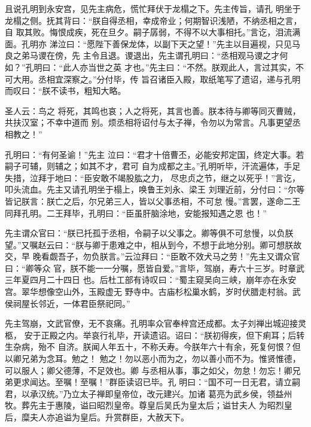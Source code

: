 \documentclass[UTF8,12pt,twoside,a4paper]{ctexart} %
\begin{document}
且说孔明到永安宫，见先主病危，慌忙拜伏于龙榻之下。先主传旨，请孔
明坐于龙榻之侧。抚其背曰：“朕自得丞相，幸成帝业；何期智识浅陋，不纳丞相之言，自
取其败。悔恨成疾，死在旦夕。嗣子孱弱，不得不以大事相托。”言讫，泪流满面。孔明亦
涕泣曰：“愿陛下善保龙体，以副下天之望！”先主以目遍视，只见马良之弟马谡在傍，先
主令且退。谡退出，先主谓孔明曰：“丞相观马谡之才何如？”孔明曰：“此人亦当世之英
才也。”先主曰：“不然。朕观此人，言过其实，不可大用。丞相宜深察之。”分付毕，传
旨召诸臣入殿，取纸笔写了遗诏，递与孔明而叹曰：“朕不读书，粗知大略。

圣人云：鸟之
将死，其鸣也哀；人之将死，其言也善。朕本待与卿等同灭曹贼，共扶汉室；不幸中道而
别。烦丞相将诏付与太子禅，令勿以为常言。凡事更望丞相教之！”

\clearpage{\pagestyle{empty}\cleardoublepage}%


	\begin{center}
	\end{center}
\vspace*{10pt}

\songti {}
\hspace{1.6em}
\indent\setlength{\parindent}{2em}%

孔明曰：“有何圣谕！”先主
泣曰：“君才十倍曹丕，必能安邦定国，终定大事。若嗣子可辅，则辅之；如其不才，君可
自为成都之主。”孔明听毕，汗流遍体，手足失措，泣拜于地曰：“臣安敢不竭股肱之力，
尽忠贞之节，继之以死乎！”言讫，叩头流血。先主又请孔明坐于榻上，唤鲁王刘永、梁王
刘理近前，分付曰：“尔等皆记朕言：朕亡之后，尔兄弟三人，皆以父事丞相，不可怠
慢。”言罢，遂命二王同拜孔明。二王拜毕，孔明曰：“臣虽肝脑涂地，安能报知遇之恩
也！”

先主谓众官曰：“朕已托孤于丞相，令嗣子以父事之。卿等俱不可怠慢，以负朕
望。”又嘱赵云曰：“朕与卿于患难之中，相从到今，不想于此地分别。卿可想朕故交，早
晚看觑吾子，勿负朕言。”云泣拜曰：“臣敢不效犬马之劳！”先主又谓众官曰：“卿等众
官，朕不能一一分嘱，愿皆自爱。”言毕，驾崩，寿六十三岁。时章武三年夏四月二十四日
也。后杜工部有诗叹曰：“蜀主窥吴向三峡，崩年亦在永安宫。翠华想像空山外，玉殿虚无
野寺中。古庙杉松巢水鹤，岁时伏腊走村翁。武侯祠屋长邻近，一体君臣祭祀同。”

先主驾崩，文武官僚，无不哀痛。孔明率众官奉梓宫还成都。太子刘禅出城迎接灵柩，
安于正殿之内。举哀行礼毕，开读遗诏。诏曰：“朕初得疾，但下痢耳；后转生杂病，殆不
自济。朕闻人年五十，不称夭寿。今朕年六十有余，死复何恨？但以卿兄弟为念耳。勉之！
勉之！勿以恶小而为之，勿以善小而不为。惟贤惟德，可以服人；卿父德薄，不足效也。卿
与丞相从事，事之如父，勿怠！勿忘！卿兄弟更求闻达。至嘱！至嘱！”群臣读诏已毕。孔
明曰：“国不可一日无君，请立嗣君，以承汉统。”乃立太子禅即皇帝位，改元建兴。加诸
葛亮为武乡侯，领益州牧。葬先主于惠陵，谥曰昭烈皇帝。尊皇后吴氏为皇太后；谥甘夫人
为昭烈皇后，糜夫人亦追谥为皇后。升赏群臣，大赦天下。
\end{document}
